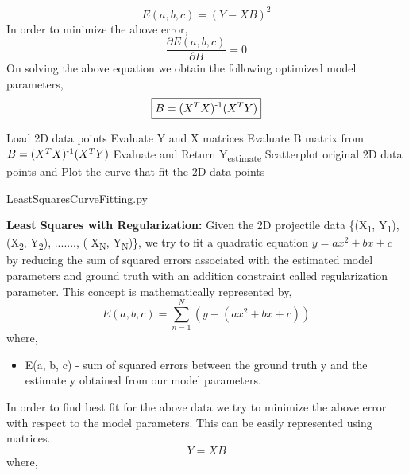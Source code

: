 \documentclass{article}
\begin{document}
\begin{equation}
\boxed{E(a, b, c) = (Y - XB)^2}
\end{equation}
In order to minimize the above error,
\begin{equation}
\boxed{\frac{\partial E(a, b, c)}{\partial B} = 0}
\end{equation}
On solving the above equation we obtain the following optimized model parameters,
\begin{equation}
\boxed{B = (X^TX)\textsuperscript{-1}(X^TY)}
\end{equation}
\begin{algorithm}
\SetAlgoLined
{}
 Load 2D data points\;
 Evaluate Y and X matrices\;
 Evaluate B matrix from $B = (X^TX)\textsuperscript{-1}(X^TY)$\;
 Evaluate and Return Y\textsubscript{estimate}\;
 Scatterplot original 2D data points and Plot the curve that fit the 2D
 data points
\caption{LeastSquaresCurveFitting.py}
\end{algorithm}
\newline \newline \textbf{Least Squares with Regularization:}
\newline Given the 2D projectile data \{(X\textsubscript{1}, Y\textsubscript{1}), (X\textsubscript{2}, Y\textsubscript{2}), ......., ( X\textsubscript{N}, Y\textsubscript{N})\}, we try to fit a quadratic equation $y = a{x^2} + bx + c$ by reducing the sum of squared errors associated with the estimated model parameters and ground truth with an addition constraint called regularization parameter. This concept is mathematically represented by,
\begin{equation}
\boxed{E(a, b, c) = \sum_{n = 1}^{N} (y - (a{x^2} + bx + c))}
\end{equation}
where,
\begin{itemize}
    \item E(a, b, c) - sum of squared errors between the ground truth y and the estimate y obtained from our model parameters. 
\end{itemize}
In order to find best fit for the above data we try to minimize the above error with respect to the model parameters. This can be easily represented using matrices.
\begin{equation}
\boxed{Y = XB}
\end{equation}
where, 
\end{document}
